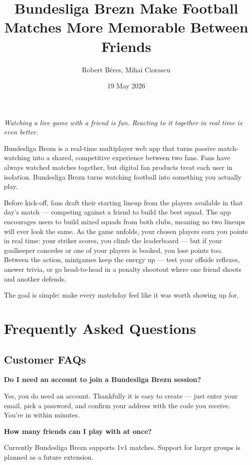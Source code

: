 \documentclass[12pt]{article}
\title{\textbf{Bundesliga Brezn Make Football Matches More Memorable Between Friends}}
\author{Robert Béres, Mihai Ciorascu}
\date{19 May 2026}
\begin{document}
\maketitle

\textit{Watching a live game with a friend is fun. Reacting to it together in real time is even better.}

\bigskip
\noindent Bundesliga Brezn is a real-time multiplayer web app that turns 
passive match-watching into a shared, competitive experience between two fans. 
Fans have always watched matches together, but digital fan products treat each 
user in isolation. Bundesliga Brezn turns watching football into something you 
actually play.

Before kick-off, fans draft their starting lineup from the players available in 
that day's match — competing against a friend to build the best squad. The app 
encourages users to build mixed squads from both clubs, meaning no two lineups 
will ever look the same. As the game unfolds, your chosen players earn you points 
in real time: your striker scores, you climb the leaderboard — but if your 
goalkeeper concedes or one of your players is booked, you lose points too. 
Between the action, minigames keep the energy up — test your offside reflexes, 
answer trivia, or go head-to-head in a penalty shootout where one friend shoots 
and another defends.

The goal is simple: make every matchday feel like it was worth showing up for.

\newpage

\section*{Frequently Asked Questions}

\subsection*{Customer FAQs}

\textbf{Do I need an account to join a Bundesliga Brezn session?}

Yes, you do need an account. Thankfully it is easy to create — just enter your 
email, pick a password, and confirm your address with the code you receive. 
You're in within minutes.

\textbf{How many friends can I play with at once?}

Currently Bundesliga Brezn supports 1v1 matches. Support for larger groups 
is planned as a future extension.
\end{document}
